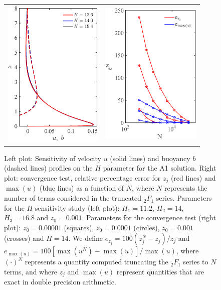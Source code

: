 %
\begin{figure}
    \begin{center}
    \begin{tabular}{c c}
	\includegraphics[width= 48.0mm]{H_sensitivity_plot.eps} &
	\includegraphics[width= 48.0mm]{halfwidth_convergence_zj_um.eps}
   \end{tabular}
    \caption{Left plot: Sensitivity of velocity $u$ (solid lines) and buoyancy $b$ (dashed lines) profiles on the $H$ parameter for the A1 solution. Right plot: convergence test, relative percentage error for $z_j$ (red lines) and $\max{(u)}$ (blue lines) as a function of $N$, where $N$ represents the number of terms considered in the truncated $_2F_1$ series. Parameters for the $H$-sensitivity study (left plot): $H_1=11.2$, $H_2=14$, $H_3=16.8$ and $z_0=0.001$.  Parameters for the convergence test (right plot): $z_0 = 0.00001$ (squares), $z_0 = 0.0001$ (circles), $z_0 = 0.001$ (crosses) and $H=14$. We define $e_{z_j} = 100(z^N_j-z_j)/z_j$ and $e_{\max{(u)}} = 100[\max{(u^N)}-\max{(u)}]/\max{(u)}$, where $(\cdot)^N$ represents a quantity computed truncating the $_2F_1$ series to $N$ terms, and where $z_j$ and $\max{(u)}$ represent quantities that are exact in double precision arithmetic. }
    \label{fig5}
    \end{center}
\end{figure}
